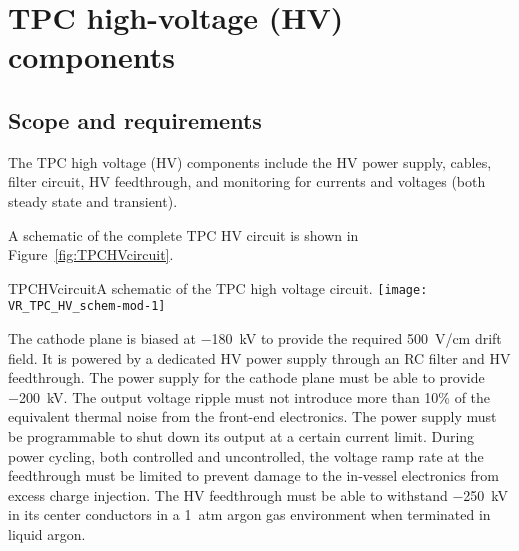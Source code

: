 




\section{TPC high-voltage (HV) components}

\subsection{Scope and requirements}

The TPC high voltage (HV) components include the HV power supply, cables,
filter circuit, HV feedthrough,  and monitoring for currents and voltages (both steady
state and transient).

A schematic of the complete TPC HV circuit is shown in Figure~\ref{fig:TPCHVcircuit}.

\begin{cdrfigure}{TPCHVcircuit}{A schematic of the TPC high voltage circuit.}
  \texttt{[image: VR\_TPC\_HV\_schem-mod-1]}
\end{cdrfigure}

The cathode plane is biased at \SI{-180}{kV} to provide the
required \SI{500}{V/cm} drift field.  It is 
powered by a dedicated HV power supply through an RC filter and HV 
feedthrough.  The power supply for the cathode plane must be able
to provide \SI{-200}{kV}.  The output voltage
ripple must not introduce more than 10\% 
of the equivalent thermal
noise from the front-end electronics. The power supply must be
programmable to shut down its output at a certain current
limit. During power cycling, both controlled and uncontrolled, the voltage 
ramp rate at the feedthrough must be limited
to prevent damage to the in-vessel electronics from excess charge
injection. The HV feedthrough must be able to withstand \SI{-250}{kV}
in its center conductors in a \SI{1}{atm} argon gas environment when
terminated in liquid argon.



